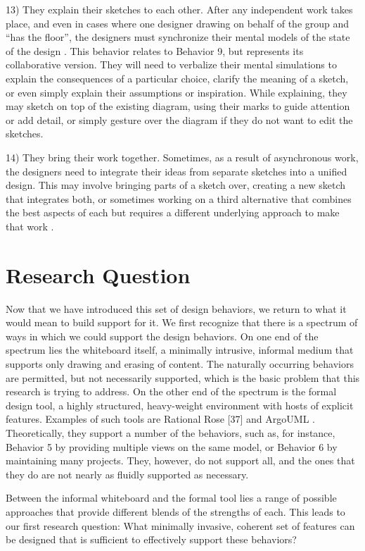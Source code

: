 13)	They explain their sketches to each other. After any independent work takes place, and even in cases where one designer drawing on behalf of the group and “has the floor”, the designers must synchronize their mental models of the state of the design \cite{dekel2007notation}. This behavior relates to Behavior 9, but represents its collaborative version. They will need to verbalize their mental simulations to explain the consequences of a particular choice, clarify the meaning of a sketch, or even simply explain their assumptions or inspiration. While explaining, they may sketch on top of the existing diagram, using their marks to guide attention or add detail, or simply gesture over the diagram if they do not want to edit the sketches.

14)	They bring their work together.  Sometimes, as a result of asynchronous work, the designers need to integrate their ideas from separate sketches into a unified design. This may involve bringing parts of a sketch over, creating a new sketch that integrates both, or sometimes working on a third alternative that combines the best aspects of each but requires a different underlying approach to make that work \cite{dekel2007notation}.

\section{Research Question}

Now that we have introduced this set of design behaviors, we return to what it would mean to build support for it. We first recognize that there is a spectrum of ways in which we could support the design behaviors. On one end of the spectrum lies the whiteboard itself, a minimally intrusive, informal medium that supports only drawing and erasing of content. The naturally occurring behaviors are permitted, but not necessarily supported, which is the basic problem that this research is trying to address. On the other end of the spectrum is the formal design tool, a highly structured, heavy-weight environment with hosts of explicit features. Examples of such tools are Rational Rose [37] and ArgoUML \cite{robbins2000cognitive}. Theoretically, they support a number of the behaviors, such as, for instance, Behavior 5 by providing multiple views on the same model, or Behavior 6 by maintaining many projects. They, however, do not support all, and the ones that they do are not nearly as fluidly supported as necessary. 

Between the informal whiteboard and the formal tool lies a range of possible approaches that provide different blends of the strengths of each. This leads to our first research question:
What minimally invasive, coherent set of features can be designed that is sufficient to effectively support these behaviors? 

